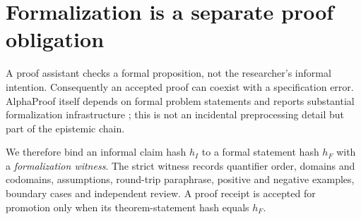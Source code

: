 \section{Formalization is a separate proof obligation}

A proof assistant checks a formal proposition, not the researcher's informal intention. Consequently an accepted proof can coexist with a specification error. AlphaProof itself depends on formal problem statements and reports substantial formalization infrastructure \cite{hubert2025}; this is not an incidental preprocessing detail but part of the epistemic chain.

We therefore bind an informal claim hash $h_I$ to a formal statement hash $h_F$ with a \emph{formalization witness}. The strict witness records quantifier order, domains and codomains, assumptions, round-trip paraphrase, positive and negative examples, boundary cases and independent review. A proof receipt is accepted for promotion only when its theorem-statement hash equals $h_F$.
